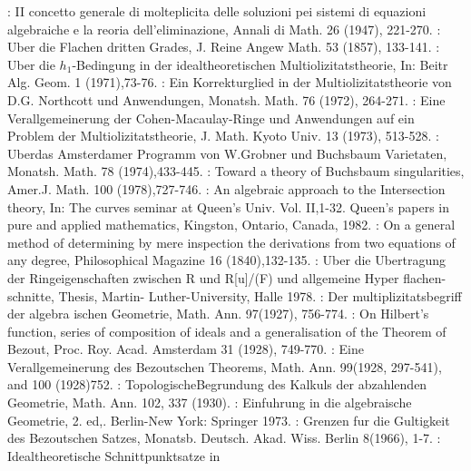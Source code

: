 \begin{thebibliography}{99}
:   II concetto generale di molteplicita
  delle soluzioni pei sistemi di equazioni algebraiche e la reoria
  dell'eliminazione, Annali di Math. 26 (1947), 221-270. 
:  Uber die Flachen dritten Grades, J. Reine
  Angew Math. 53 (1857), 133-141. 
:  Uber die $h_1$-Bedingung in
  der idealtheoretischen Multiolizitatstheorie, In:  Beitr
  Alg. Geom. 1 (1971),73-76. 
:   Ein Korrekturglied in der
  Multiolizitatstheorie von D.G. Northcott und Anwendungen,
  Monatsh. Math. 76 (1972), 264-271. 
:   Eine Verallgemeinerung der
  Cohen-Macaulay-Ringe und Anwendungen auf ein Problem der
  Multiolizitatstheorie, J. Math. Kyoto Univ. 13 (1973), 513-528. 
:  Uber\pageoriginale das Amsterdamer
  Programm von W.Grobner und Buchsbaum Varietaten, Monatsh. Math. 78
  (1974),433-445. 
:  Toward a theory of Buchsbaum
  singularities, Amer.J. Math. 100 (1978),727-746. 
:   An algebraic approach to
  the Intersection theory, In: The curves seminar at Queen's
  Univ. Vol. II,1-32. Queen's papers in pure and applied
  mathematics, Kingston, Ontario, Canada, 1982. 
 :   On a general method of determining
   by mere inspection the derivations from two equations of any
   degree, Philosophical Magazine 16 (1840),132-135. 
 :   Uber die Ubertragung der
   Ringeigenschaften zwischen R und R[u]/(F) und allgemeine Hyper
   flachen-schnitte, Thesis, Martin- Luther-University, Halle 1978. 
:   Der multiplizitatsbegriff der
  algebra ischen Geometrie, Math. Ann. 97(1927), 756-774. 
:   On Hilbert's function, series
  of composition of ideals and a generalisation of the Theorem of
  Bezout, Proc. Roy. Acad. Amsterdam 31 (1928), 749-770. 
:   Eine Verallgemeinerung des
  Bezoutschen Theorems, Math. Ann. 99(1928, 297-541), and 100
  (1928)752. 
:   Topologische\pageoriginale Begrundung des
  Kalkuls der abzahlenden Geometrie, Math. Ann. 102, 337 (1930). 
:   Einfuhrung in die algebraische
  Geometrie, 2. ed,. Berlin-New York: Springer 1973. 
:   Grenzen fur die Gultigkeit des Bezoutschen
  Satzes, Monatsb. Deutsch. Akad. Wiss. Berlin 8(1966), 1-7. 
:   Idealtheoretische Schnittpunktsatze in

\end{thebibliography}
